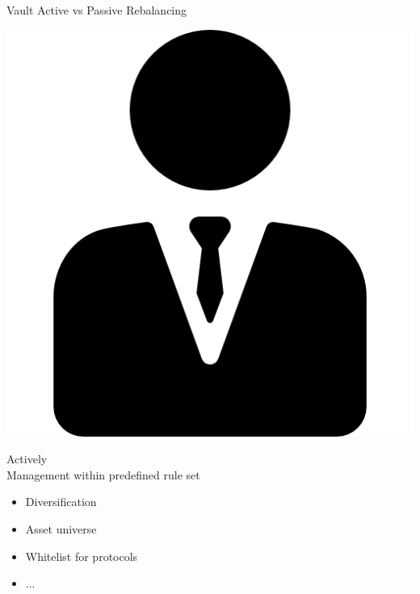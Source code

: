 \documentclass[handout]{beamer}
\begin{document}
\begin{frame}{Vault Active vs Passive Rebalancing}
	\begin{minipage}{0.4\textwidth}
		\begin{center}
			\includegraphics[scale=0.18]{../assets/images/manager.png}
		\end{center}
		\begin{center}
		Actively \\ \vspace{1em}
		Management within predefined rule set
\vspace{0.5em}		
			\begin{scriptsize}
				\begin{itemize}
					\item<1-> Diversification
					\item<2-> Asset universe
					\item<3-> Whitelist for protocols
					\item<4-> ...
				\end{itemize}		
			\end{scriptsize}
		\end{center}		
	\end{minipage}
	\hfill
	\begin{minipage}{0.4\textwidth}
		\begin{center}

\end{center}
\end{minipage}
\end{frame}
\end{document}
